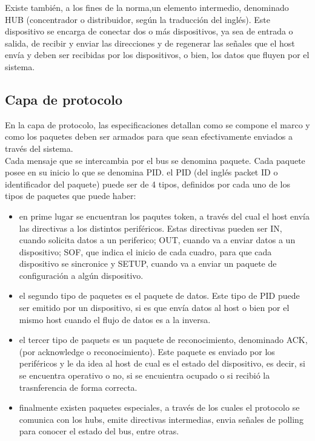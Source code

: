 	Existe también, a los fines de la norma,un elemento intermedio, denominado HUB (concentrador o distribuidor, según la traducción del inglés). Este dispositivo se encarga de conectar dos o más dispositivos, ya sea de entrada o salida, de recibir y enviar las direcciones y de regenerar las señales que el host envía y deben ser recibidas por los dispositivos, o bien, los datos que fluyen por el sistema.\\
	
\subsection{Capa de protocolo}
	En la capa de protocolo, las especificaciones detallan como se compone el marco y como los paquetes deben ser armados para que sean efectivamente enviados a través del sistema.\\
	
	Cada mensaje que se intercambia por el bus se denomina paquete. Cada paquete posee en su inicio lo que se denomina PID. el PID (del inglés packet ID o identificador del paquete) puede ser de 4 tipos, definidos por cada uno de los tipos de paquetes que puede haber: 
	\begin{itemize}
		\item en prime lugar se encuentran los paqutes token, a través del cual el host envía las directivas a los distintos periféricos. Estas directivas pueden ser IN, cuando solicita datos a un periferico; OUT, cuando va a enviar datos a un dispositivo; SOF, que indica el inicio de cada cuadro, para que cada dispositivo se sincronice y SETUP, cuando va a enviar un paquete de configuración a algún dispositivo.
		\item el segundo tipo de paquetes es el paquete de datos. Este tipo de PID puede ser emitido por un dispositivo, si es que envía datos al host o bien por el mismo host cuando el flujo de datos es a la inversa.
		\item el tercer tipo de paquets es un paquete de reconocimiento, denominado ACK, (por acknowledge o reconocimiento). Este paquete es enviado por los periféricos y le da idea al host de cual es el estado del dispositivo, es decir, si se encuentra operativo o no, si se encuientra ocupado o si recibió la trasnferencia de forma correcta.
		\item finalmente existen paquetes especiales, a través de los cuales el protocolo se comunica con los hubs, emite directivas intermedias, envia señales de polling para conocer el estado del bus, entre otras.
	\end{itemize}
	

